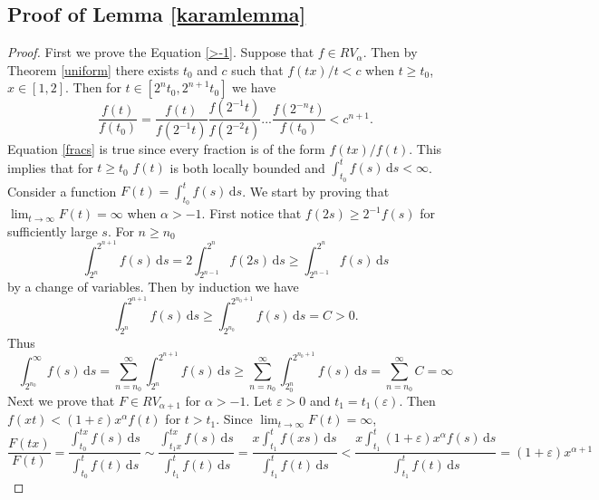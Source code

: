 \documentclass[english,12pt,a4paper,pdftex,sci,utf8]{aaltothesis} %
\begin{document}
\subsection{Proof of Lemma \ref{karamlemma}}

\begin{proof}
First we prove the Equation \eqref{>-1}. Suppose that $f \in RV_{\alpha}$. Then by Theorem \ref{uniform} there exists $t_0$ and $c$ such that $f(tx)/t<c$ when $t \geq t_0$, $x \in [1,2]$. Then for $t \in [2^nt_0, 2^{n+1}t_0]$ we have
\begin{equation}
\frac{f(t)}{f(t_0)}=\frac{f(t)}{f(2^{-1}t)}\frac{f(2^{-1}t)}{f(2^{-2}t)} ... \frac{f(2^{-n}t)}{f(t_0)} < c^{n+1}.
\label{fracs}
\end{equation}
Equation \eqref{fracs} is true since every fraction is of the form $f(tx)/f(t)$. This implies that for $t\geq t_0$ $f(t)$ is both locally bounded and $\int_{t_0}^{t}f(s) \, \mathrm{d}s<\infty$. Consider a function $F(t) = \int_{t_0}^{t}f(s) \, \mathrm{d}s$. We start by proving that $\lim_{t \rightarrow \infty} F(t) = \infty$ when $\alpha>-1$. First notice that $f(2s) \geq 2^{-1}f(s)$ for sufficiently large $s$. For $n\geq n_0$
\begin{equation}
\int_{2^n}^{2^{n+1}} f(s) \, \mathrm{d}s = 2\int_{2^{n-1}}^{2^{n}} f(2s) \, \mathrm{d}s \geq \int_{2^{n-1}}^{2^n} f(s) \, \mathrm{d}s
\label{varchange}
\end{equation}
by a change of variables. Then by induction we have
\begin{equation}
\int_{2^n}^{2^{n+1}} f(s)\, \mathrm{d}s \geq \int_{2^{n_0}}^{2^{n_0+1}} f(s) \, \mathrm{d}s = C > 0.
\label{induction}
\end{equation}
Thus
\begin{equation}
\int_{2^{n_0}}^{\infty} f(s) \, \mathrm{d}s = \sum_{n=n_0}^{\infty} \int_{2^n}^{2^{n+1}} f(s) \, \mathrm{d}s \geq \sum_{n=n_0}^{\infty} \int_{2^n_0}^{2^{n_0+1}} f(s)\, \mathrm{d}s = \sum_{n=n_0}^{\infty} C = \infty
\label{infinite}
\end{equation}
Next we prove that $F \in RV_{\alpha+1}$ for $\alpha>-1$. Let $\varepsilon>0$ and $t_1=t_1(\varepsilon)$. Then $f(xt)<(1+\varepsilon)x^{\alpha}f(t)$ for $t>t_1$. Since $\lim_{t \rightarrow \infty} F(t)=\infty$,
\begin{equation*}
\frac{F(tx)}{F(t)} = \frac{\int_{t_0}^{tx} f(s) \, \mathrm{d}s}{\int_{t_0}^{t} f(t)\, \mathrm{d}s} \sim \frac{\int_{t_1x}^{tx} f(s)\, \mathrm{d}s}{\int_{t_1}^{t} f(t)\, \mathrm{d}s}=\frac{x\int_{t_1}^{t} f(xs)\, \mathrm{d}s}{\int_{t_1}^{t} f(t)\, \mathrm{d}s} < \frac{x\int_{t_1}^{t}(1+\varepsilon)x^{\alpha} f(s)\, \mathrm{d}s}{\int_{t_1}^{t} f(t)\, \mathrm{d}s} = (1+ \varepsilon)x^{\alpha+1}

\end{equation*}
\end{proof}
\end{document}
